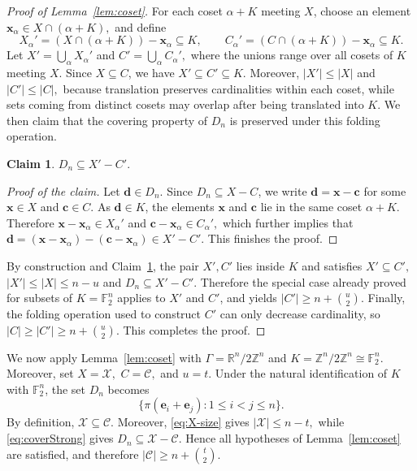\documentclass[11pt]{article}
\newtheorem{claim}[theorem]{Claim}
\theoremstyle{definition}
\newenvironment{poc}{\begin{proof}[Proof of the claim]\renewcommand*{\qedsymbol}{$\blacksquare$}}{\end{proof}}
\begin{document}
\begin{proof}[Proof of Lemma~\ref{lem:coset}]
For each coset \(\alpha+K\) meeting \(X\), choose an element
\(
    \boldsymbol{x}_\alpha\in X\cap(\alpha+K),
\)
and define
\[
    X_\alpha'
    =
    (X\cap(\alpha+K))-\boldsymbol{x}_\alpha
    \subseteq K,
    \qquad
    C_\alpha'
    =
    (C\cap(\alpha+K))-\boldsymbol{x}_\alpha
    \subseteq K.
\]
Let
\(
    X'=\bigcup_\alpha X_\alpha'\) and
    \(
    C'=\bigcup_\alpha C_\alpha',
\)
where the unions range over all cosets of \(K\) meeting \(X\).  Since \(X\subseteq C\), we have
\(
    X'\subseteq C'\subseteq K.
\)
Moreover,
\(
    |X'|\le |X|\) and
    \(
    |C'|\le |C|,
\)
because translation preserves cardinalities within each coset, while sets coming from distinct cosets may overlap after being translated into \(K\). We then claim that the covering property of \(D_n\) is preserved under this folding operation.
\begin{claim}\label{claim:DXC}
    \(D_n\subseteq X'-C'.\)
\end{claim}
\begin{poc}
    Let \(\boldsymbol{d}\in D_n\).  Since \(D_n\subseteq X-C\), we write
    \(
        \boldsymbol{d}=\boldsymbol{x}-\boldsymbol{c}
    \)
    for some \(\boldsymbol{x}\in X\) and \(\boldsymbol{c}\in C\).  As \(\boldsymbol{d}\in K\), the elements \(\boldsymbol{x}\) and \(\boldsymbol{c}\) lie in the same coset \(\alpha+K\).  Therefore
    \(
        \boldsymbol{x}-\boldsymbol{x}_\alpha\in X_\alpha'\) and
        \(
        \boldsymbol{c}-\boldsymbol{x}_\alpha\in C_\alpha',
    \)
    which further implies that
    \(
        \boldsymbol{d}
        =
        (\boldsymbol{x}-\boldsymbol{x}_\alpha)
        -
        (\boldsymbol{c}-\boldsymbol{x}_\alpha)
        \in X'-C'.
    \) This finishes the proof.
\end{poc}
By construction and Claim~\ref{claim:DXC}, the pair \(X',C'\) lies inside \(K\) and satisfies
\(
    X'\subseteq C',\) \(
    |X'|\le |X|\le n-u\) and
    \(D_n\subseteq X'-C'.
\)
Therefore the special case already proved for subsets of \(K=\mathbb{F}_2^n\) applies to \(X'\) and \(C'\), and yields
\(
    |C'|\ge n+\binom{u}{2}.
\)
Finally, the folding operation used to construct \(C'\) can only decrease cardinality, so 
\(
    |C|\ge |C'|\ge n+\binom{u}{2}.
\)
This completes the proof.
\end{proof}

We now apply Lemma~\ref{lem:coset} with
\( \Gamma=\mathbb{R}^{n}/2\mathbb{Z}^{n}\)
and \(K=\mathbb{Z}^{n}/2\mathbb{Z}^{n}\cong \mathbb{F}_2^n.\)
Moreover, set
\(
    X=\mathcal{X},\) \(C=\mathcal{C},\) and \(u=t.\)
Under the natural identification of \(K\) with \(\mathbb{F}_2^n\), the set \(D_n\) becomes
\[
    \{\pi(\boldsymbol{e}_i+\boldsymbol{e}_j):1\le i<j\le n\}.
\]
By definition, \(\mathcal X\subseteq \mathcal C\).  Moreover, \eqref{eq:X-size} gives
\(
    |\mathcal X|\le n-t,
\)
while \eqref{eq:coverStrong} gives
\(
    D_n\subseteq \mathcal X-\mathcal C.
\)
Hence all hypotheses of Lemma~\ref{lem:coset} are satisfied, and therefore
\(
    |\mathcal C|\ge n+\binom{t}{2}.
\)
\end{document}
